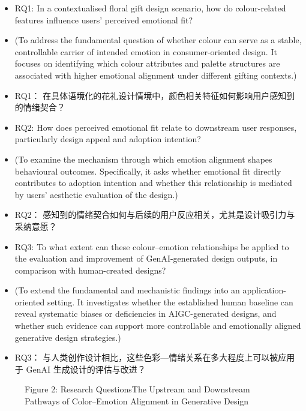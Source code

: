 \begin{itemize}

  \item RQ1: In a contextualised floral gift design scenario, how do colour-related features influence users’ perceived emotional fit?

  \item (To address the fundamental question of whether colour can serve as a stable, controllable carrier of intended emotion in consumer-oriented design. It focuses on identifying which colour attributes and palette structures are associated with higher emotional alignment under different gifting contexts.)

  \item RQ1： 在具体语境化的花礼设计情境中，颜色相关特征如何影响用户感知到的情绪契合？

  \item RQ2: How does perceived emotional fit relate to downstream user responses, particularly design appeal and adoption intention?

  \item (To examine the mechanism through which emotion alignment shapes behavioural outcomes. Specifically, it asks whether emotional fit directly contributes to adoption intention and whether this relationship is mediated by users’ aesthetic evaluation of the design.)

  \item RQ2： 感知到的情绪契合如何与后续的用户反应相关，尤其是设计吸引力与采纳意愿？

  \item RQ3: To what extent can these colour–emotion relationships be applied to the evaluation and improvement of GenAI-generated design outputs, in comparison with human-created designs?

  \item (To extend the fundamental and mechanistic findings into an application-oriented setting. It investigates whether the established human baseline can reveal systematic biases or deficiencies in AIGC-generated designs, and whether such evidence can support more controllable and emotionally aligned generative design strategies.)

  \item RQ3： 与人类创作设计相比，这些色彩—情绪关系在多大程度上可以被应用于 GenAI 生成设计的评估与改进？

\end{itemize}

\begin{figure}[htbp]

  \centering



  \caption{Figure 2: Research QuestionsThe Upstream and Downstream Pathways of Color–Emotion Alignment in Generative Design}

  \label{fig:figure_2_research_questionsthe_upstream}

\end{figure}

